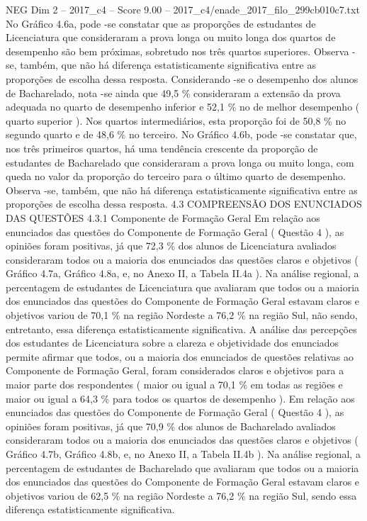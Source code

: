 \begin{textsample}{NEG Dim 2 – 2017\_c4 – Score 9.00 – 2017\_c4/enade\_2017\_filo\_299cb010c7.txt}
No Gráfico 4.6a, pode -se constatar que as proporções de estudantes de Licenciatura que consideraram a prova longa ou muito longa dos quartos de desempenho são bem próximas, sobretudo nos três quartos superiores.
Observa -se, também, que não há diferença estatisticamente significativa entre as proporções de escolha dessa resposta.
Considerando -se o desempenho dos alunos de Bacharelado, nota -se ainda que 49,5 \% consideraram a extensão da prova adequada no quarto de desempenho inferior e 52,1 \% no de melhor desempenho ( quarto superior ).
Nos quartos intermediários, esta proporção foi de 50,8 \% no segundo quarto e de 48,6 \% no terceiro.
No Gráfico 4.6b, pode -se constatar que, nos três primeiros quartos, há uma tendência crescente da proporção de estudantes de Bacharelado que consideraram a prova longa ou muito longa, com queda no valor da proporção do terceiro para o último quarto de desempenho.
Observa -se, também, que não há diferença estatisticamente significativa entre as proporções de escolha dessa resposta. 4.3 COMPREENSÃO DOS ENUNCIADOS DAS QUESTÕES 4.3.1 Componente de Formação Geral Em relação aos enunciados das questões do Componente de Formação Geral ( Questão 4 ), as opiniões foram positivas, já que 72,3 \% dos alunos de Licenciatura avaliados consideraram todos ou a maioria dos enunciados das questões claros e objetivos ( Gráfico 4.7a, Gráfico 4.8a, e, no Anexo II, a Tabela II.4a ).
Na análise regional, a percentagem de estudantes de Licenciatura que avaliaram que todos ou a maioria dos enunciados das questões do Componente de Formação Geral estavam claros e objetivos variou de 70,1 \% na região Nordeste a 76,2 \% na região Sul, não sendo, entretanto, essa diferença estatisticamente significativa.
A análise das percepções dos estudantes de Licenciatura sobre a clareza e objetividade dos enunciados permite afirmar que todos, ou a maioria dos enunciados de questões relativas ao Componente de Formação Geral, foram considerados claros e objetivos para a maior parte dos respondentes ( maior ou igual a 70,1 \% em todas as regiões e maior ou igual a 64,3 \% para todos os quartos de desempenho ).
Em relação aos enunciados das questões do Componente de Formação Geral ( Questão 4 ), as opiniões foram positivas, já que 70,9 \% dos alunos de Bacharelado avaliados consideraram todos ou a maioria dos enunciados das questões claros e objetivos ( Gráfico 4.7b, Gráfico 4.8b, e, no Anexo II, a Tabela II.4b ).
Na análise regional, a percentagem de estudantes de Bacharelado que avaliaram que todos ou a maioria dos enunciados das questões do Componente de Formação Geral estavam claros e objetivos variou de 62,5 \% na região Nordeste a 76,2 \% na região Sul, sendo essa diferença estatisticamente significativa.

\end{textsample}
